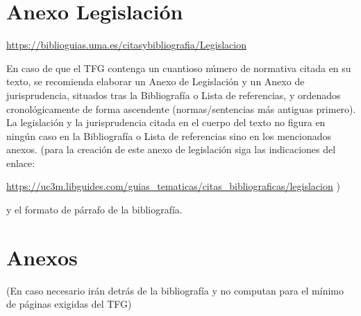 \documentclass[13pt,a4paper]{report}
\begin{document}

\renewcommand{\bibname}{\fontsize{16}{20}\selectfont Bibliografía} %
\renewcommand{\bibfont}{\fontsize{13}{15}\selectfont} %

\section{Anexo Legislación}

\vspace{12pt}

\href{https://biblioguias.uma.es/citasybibliografia/Legislacion}{https://biblioguias.uma.es/citasybibliografia/Legislacion} 

\vspace{12pt}

En caso de que el TFG contenga un cuantioso número de normativa citada en su texto, se recomienda elaborar un Anexo de Legislación y un Anexo de jurisprudencia, situados tras la Bibliografía o Lista de referencias, y ordenados cronológicamente de forma ascendente (normas/sentencias más antiguas primero). La legislación y la jurisprudencia citada en el cuerpo del texto no figura en ningún caso en la Bibliografía o Lista de referencias sino en los mencionados anexos.
(para la creación de este anexo de legislación siga las indicaciones del enlace:

\vspace{12pt}

\href{https://uc3m.libguides.com/guias\_tematicas/citas\_bibliograficas/legislacion}{https://uc3m.libguides.com/guias\_tematicas/citas\_bibliograficas/legislacion}
 ) 

 \vspace{12pt}

y el formato de párrafo de la bibliografía.

\vspace{12pt}

\section{Anexos}

(En caso necesario irán detrás de la bibliografía y no computan para el mínimo de páginas exigidas del TFG)
\end{document}
